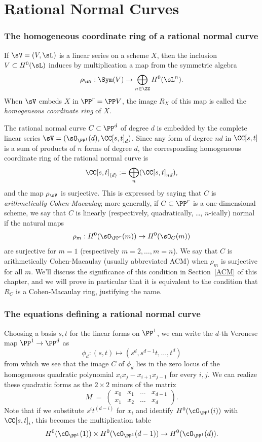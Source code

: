 \section{Rational Normal Curves}\label{rational normal curves section}

\subsubsection{The homogeneous coordinate ring of a rational normal curve}

If $\sV = (V,\sL)$ is a linear series on a scheme $X$, then the inclusion
$V\subset H^0(\sL)$ induces by multiplication a map from the symmetric algebra
$$
\rho_{\sV}: \Sym(V) \to  \bigoplus_{n\in \ZZ} H^0(\sL^n).
$$
When $\sV$ embeds $X$ in $\PP^r = \PP V$, the image $R_{X}$ of this map is called the \emph{homogeneous coordinate ring} of $X$. 

The rational normal curve $C\subset \PP^d$ of degree $d$ is embedded by the complete linear series
$\sV = (\sO_{\PP^1}(d), \CC[s,t]_d)$. Since any form of degree $nd$ in $\CC[s,t]$ is a sum of products of $n$ forms of degree $d$, 
the corresponding homogeneous coordinate ring of the rational normal curve is 
$$
\CC[s,t]_{(d)} := \bigoplus_n(\CC[s,t]_{nd}),
$$
and the map $\rho_{\sV}$ is surjective. This is expressed by saying
that $C$ is \emph{arithmetically Cohen-Macaulay}; more generally, if $C\subset \PP^r$ is 
a one-dimensional scheme, we say that $C$ is linearly (respectively, quadratically, \dots, $n$-ically) normal
if  the natural maps
$$
\rho_m: H^0(\sO_{\PP^r}(m)) \to H^0(\sO_{C}(m))
$$
are surjective for  $m=1$ (respectively $m=2,\dots, m=n$). We say that $C$ is arithmetically Cohen-Macaulay
(usually abbreviated ACM)
 when $\rho_m$ is surjective for all $m$. We'll discuss the significance of this condition in Section~\ref{ACM} of this chapter, and we will prove in particular that it is equivalent to the condition that $R_{C}$ is a Cohen-Macaulay ring, justifying
 the name.



\subsubsection{The equations defining a rational normal curve}

Choosing a basis $s,t$ for the linear forms on $\PP^1$, we can write the $d$-th Veronese map $\PP^{1}\to \PP^{d}$ as
$$
\phi_d : (s,t) \mapsto (s^d, s^{d-1}t,\dots, t^d)
$$
from which we see that the image $C$ of $\phi_d$ lies in the zero locus of the homogeneous quadratic polynomial $x_i x_j - x_{i+1}x_{j-1}$ for every $i,j$. We can realize these quadratic forms as the $2\times 2$ minors of the matrix
$$
M \; = \; \begin{pmatrix}
x_0 & x_1 & \dots & x_{d-1} \\
x_1 & x_2 & \dots & x_d
\end{pmatrix}.
$$
Note that if we substitute $s^it^{(d-i)}$ for $x_i$ and identify $H^0(\cO_{\PP^1}(i))$ with $\CC[s,t]_i$, this becomes the multiplication table
$$
H^0(\cO_{\PP^1}(1)) \times H^0(\cO_{\PP^1}(d-1)) \to H^0(\cO_{\PP^1}(d)).
$$


